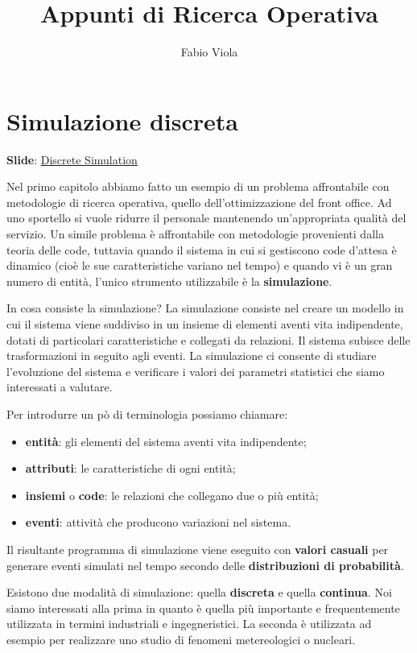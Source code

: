 \documentclass[11pt]{book}
\title{Appunti di Ricerca Operativa}
\author{Fabio Viola}
\date{}
\begin{document}
\chapter{Simulazione discreta}

\scriptsize {\bf Slide}:
\href{http://www.or.deis.unibo.it/staff_pages/martello/Chapter11.zip}{Discrete
  Simulation} \normalsize
\vspace{20pt}

Nel primo capitolo abbiamo fatto un esempio di un problema
affrontabile con metodologie di ricerca operativa, quello
dell'ottimizzazione del front office. Ad uno sportello si vuole
ridurre il personale mantenendo un'appropriata qualit\`a del
servizio. Un simile problema \`e affrontabile con metodologie
provenienti dalla teoria delle code, tuttavia quando il sistema in cui
si gestiscono code d'attesa \`e dinamico (cio\`e le sue
caratteristiche variano nel tempo) e quando vi \`e un gran numero di
entit\`a, l'unico strumento utilizzabile \`e la {\bf simulazione}.

In cosa consiste la simulazione? La simulazione consiste nel creare un
modello in cui il sistema viene suddiviso in un insieme di elementi
aventi vita indipendente, dotati di particolari caratteristiche e
collegati da relazioni. Il sistema subisce delle trasformazioni in
seguito agli eventi. La simulazione ci consente di studiare
l'evoluzione del sistema e verificare i valori dei parametri
statistici che siamo interessati a valutare.

Per introdurre un p\`o di terminologia possiamo chiamare:

\begin{itemize}
\item {\bf entit\`a}: gli elementi del sistema aventi vita
  indipendente;
\item {\bf attributi}: le caratteristiche di ogni entit\`a;
\item {\bf insiemi} o {\bf code}: le relazioni che collegano due o
  pi\`u entit\`a;
\item {\bf eventi}: attivit\`a che producono variazioni nel sistema.
\end{itemize}

Il risultante programma di simulazione viene eseguito con {\bf valori
  casuali} per generare eventi simulati nel tempo secondo delle {\bf
  distribuzioni di probabilit\`a}.

Esistono due modalit\`a di simulazione: quella {\bf discreta} e quella
{\bf continua}. Noi siamo interessati alla prima in quanto \`e quella
pi\`u importante e frequentemente utilizzata in termini industriali e
ingegneristici. La seconda \`e utilizzata ad esempio per realizzare
uno studio di fenomeni metereologici o nucleari.
\end{document}
